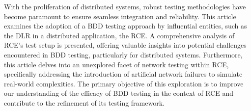 With the proliferation of distributed systems, robust testing methodologies have become paramount to ensure seamless integration and reliability. This article examines the adoption of a \ac{BDD} testing approach by influential entities, such as the \ac{DLR} in a distributed application, the \ac{RCE}. A comprehensive analysis of \ac{RCE}'s test setup is presented, offering valuable insights into potential challenges encountered in \ac{BDD} testing, particularly for distributed systems. Furthermore, this article delves into an unexplored facet of network testing within \ac{RCE}, specifically addressing the introduction of artificial network failures to simulate real-world complexities. The primary objective of this exploration is to improve our understanding of the efficacy of \ac{BDD} testing in the context of \ac{RCE} and contribute to the refinement of its testing framework.